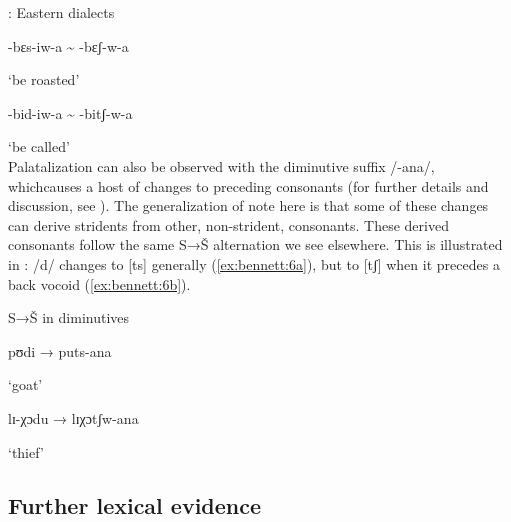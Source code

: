 \ea\label{ex:bennett:5}
: Eastern dialects \citep{Cole1955}\\
\ea\label{ex:bennett:5a}

-bɛs-iw-a {\textasciitilde} -bɛʃ-w-a

     ‘be roasted’\\
\ex\label{ex:bennett:5b}

-bid-iw-a  {\textasciitilde} -bitʃ-w-a

     ‘be called’\\
\z
\z
Palatalization can also be observed with the diminutive suffix /-ana/, which\linebreak causes a host of changes to preceding consonants (for further details and discussion, see \citealt{Cole1955,Louw1975,Herbert1990,Bateman:2007aa,Kotze&Zerbian2008}). The generalization of note here is that some of these changes can derive stridents from other, non-strident, consonants. These derived consonants follow the same S→Š alternation we see elsewhere. This is illustrated in : /d/ changes to [ts] generally (\ref{ex:bennett:6a}), but to [tʃ] when it precedes a back vocoid (\ref{ex:bennett:6b}). 

\ea\label{ex:bennett:6}
S→Š in diminutives \citep{Cole1955}\\
\ea\label{ex:bennett:6a}

pʊdi  → puts-ana

     ‘goat’\\
\ex\label{ex:bennett:6b}

lɪ-χɔdu  → lɪχɔtʃw-ana

     ‘thief’\\
\z
\z

\subsection{Further lexical evidence}\label{sec:bennett:2.5}


